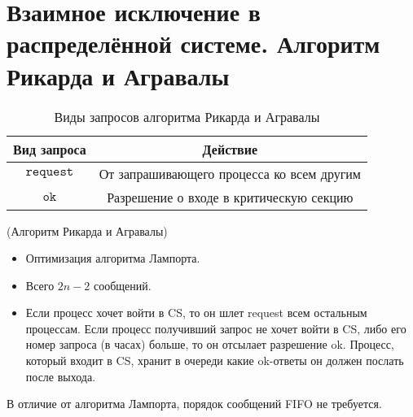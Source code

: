\section{Взаимное исключение в распределённой системе. Алгоритм Рикарда и Агравалы}

\begin{table}[!ht]
    \centering
    \begin{tabular}{|c|c|} \hline
        Вид запроса & Действие \\ \hline
        $\texttt{request}$ & От запрашивающего процесса ко всем другим\\ \hline
        $\texttt{ok}$ & Разрешение о входе в критическую секцию \\ \hline
    \end{tabular}
    \caption{Виды запросов алгоритма Рикарда и Агравалы}
\end{table}

\begin{algorithm}(Алгоритм Рикарда и Агравалы)
\begin{itemize}
    \item Оптимизация алгоритма Лампорта.
    \item Всего $2n-2$ сообщений.
    \item Если процесс хочет войти в CS, то он шлет request всем остальным процессам.
        Если процесс получивший запрос не хочет войти в CS, либо его номер
        запроса (в часах) больше, то он отсылает разрешение ok.
        Процесс, который входит в CS, хранит в очереди какие ok-ответы он должен
        послать после выхода.
\end{itemize}
\end{algorithm}

\begin{remark}
    В отличие от алгоритма Лампорта, порядок сообщений FIFO не требуется.
\end{remark}
